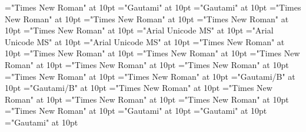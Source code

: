 \documentclass[c5paper,twoside]{article}
\begin{document}
 
\pagestyle{plain} 
\font\spanenentryletDatadicBody="Times New Roman" at 10pt
\font\spantexitemtetranslationentranslationsexamplessensesensesentryletDatadicBody="Gautami" at 10pt
\font\xitemtetranslationentranslationsexamplessensesensesentryletDatadicBody="Gautami" at 10pt
\font\spanentranslationentranslationsexamplessensesensesentryletDatadicBody="Times New Roman" at 10pt
\font\spanenxitementranslationentranslationsexamplessensesensesentryletDatadicBody="Times New Roman" at 10pt
\font\xitementranslationentranslationsexamplessensesensesentryletDatadicBody="Times New Roman" at 10pt
\font\translationentranslationsexamplessensesensesentryletDatadicBody="Times New Roman" at 10pt
\font\spanenLexSensepublishStemGlossPubLehisensesensesentryletDatadicBody="Arial Unicode MS" at 10pt
\font\spanhiLexSensepublishStemGlossPubLehisensesensesentryletDatadicBody="Arial Unicode MS" at 10pt
\font\LexSensepublishStemGlossPubLehisensesensesentryletDatadicBody="Arial Unicode MS" at 10pt
\font\spanenpictureLabelenpictureCaptionpictureRightentryletDatadicBody="Times New Roman" at 10pt
\font\pictureLabelenpictureCaptionpictureRightentryletDatadicBody="Times New Roman" at 10pt
\font\spanenCmPicturepublishStemPileThumbnailPubpictureCaptionpictureRightentryletDatadicBody="Times New Roman" at 10pt
\font\CmPicturepublishStemPileThumbnailPubpictureCaptionpictureRightentryletDatadicBody="Times New Roman" at 10pt
\font\pictureCaptionpictureRightentryletDatadicBody="Times New Roman" at 10pt
\font\picturepictureRightentryletDatadicBody="Times New Roman" at 10pt
\font\pictureRightentryletDatadicBody="Times New Roman" at 10pt
\font\spanencomplexformrefsentryletDatadicBody="Times New Roman" at 10pt
\font\spanencomplexformformggoTeluINcomplexformrefsentryletDatadicBody="Gautami/B" at 10pt
\font\complexformformggoTeluINcomplexformrefsentryletDatadicBody="Gautami/B" at 10pt
\font\spanencomplexformtypecomplexformrefsentryletDatadicBody="Times New Roman" at 10pt
\font\spanenLexEntryTypepublishStemComplexFormTypeReverseAbbrPubencomplexformtypecomplexformrefsentryletDatadicBody="Times New Roman" at 10pt
\font\LexEntryTypepublishStemComplexFormTypeReverseAbbrPubencomplexformtypecomplexformrefsentryletDatadicBody="Times New Roman" at 10pt
\font\complexformtypecomplexformrefsentryletDatadicBody="Times New Roman" at 10pt
\font\complexformrefsentryletDatadicBody="Times New Roman" at 10pt
\font\spanentranslationLdtetranslationsexamplessensesensesentryletDatadicBody="Gautami" at 10pt
\font\spantetranslationLdtetranslationsexamplessensesensesentryletDatadicBody="Gautami" at 10pt
\font\translationLdtetranslationsexamplessensesensesentryletDatadicBody="Gautami" at 10pt
\end{document}
